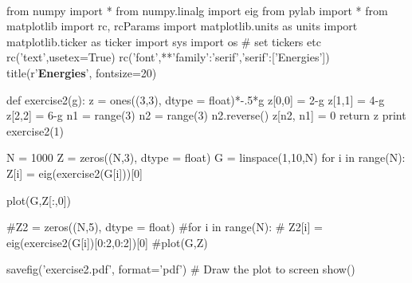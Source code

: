 \documentclass[%
twoside,                 %
final,                   %
10pt]{article}
\begin{document}
\paragraph{}
\bpycod
from numpy import *
from numpy.linalg import eig
from pylab import *
from matplotlib import rc, rcParams
import matplotlib.units as units
import matplotlib.ticker as ticker
import sys
import os
# set tickers etc
rc('text',usetex=True)
rc('font',**{'family':'serif','serif':['Energies']})
title(r'{\bf Energies}', fontsize=20)     


def exercise2(g):
    z = ones((3,3), dtype = float)*-.5*g
    z[0,0] = 2-g
    z[1,1] = 4-g
    z[2,2] = 6-g
    n1 = range(3)
    n2 = range(3)
    n2.reverse()
    z[n2, n1] = 0
    return z
print exercise2(1)

N = 1000
Z = zeros((N,3), dtype = float)
G = linspace(1,10,N)
for i in range(N):
    Z[i] = eig(exercise2(G[i]))[0]

plot(G,Z[:,0])

#Z2 = zeros((N,5), dtype = float)
#for i in range(N):
#    Z2[i] = eig(exercise2(G[i])[0:2,0:2])[0]
#plot(G,Z)

savefig('exercise2.pdf', format='pdf')
# Draw the plot to screen
show()
\epycod

    





\printindex
\end{document}
